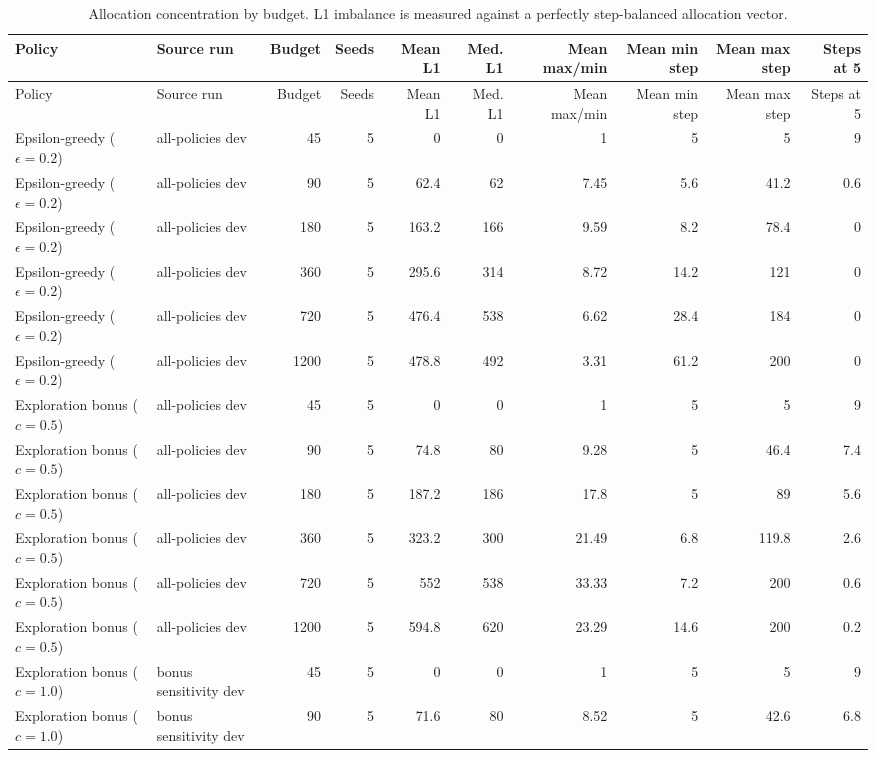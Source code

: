 \begin{landscape}
\begin{scriptsize}
\begin{longtable}{llrrrrrrrr}
\caption{Allocation concentration by budget. L1 imbalance is measured against a perfectly step-balanced allocation vector.}\label{tab:concentration-by-budget}\\
\toprule
Policy & Source run & Budget & Seeds & Mean L1 & Med. L1 & Mean max/min & Mean min step & Mean max step & Steps at 5 \\
\midrule
\endfirsthead
\toprule
Policy & Source run & Budget & Seeds & Mean L1 & Med. L1 & Mean max/min & Mean min step & Mean max step & Steps at 5 \\
\midrule
\endhead
Epsilon-greedy ($\epsilon=0.2$) & all-policies dev & 45 & 5 & 0 & 0 & 1 & 5 & 5 & 9 \\
Epsilon-greedy ($\epsilon=0.2$) & all-policies dev & 90 & 5 & 62.4 & 62 & 7.45 & 5.6 & 41.2 & 0.6 \\
Epsilon-greedy ($\epsilon=0.2$) & all-policies dev & 180 & 5 & 163.2 & 166 & 9.59 & 8.2 & 78.4 & 0 \\
Epsilon-greedy ($\epsilon=0.2$) & all-policies dev & 360 & 5 & 295.6 & 314 & 8.72 & 14.2 & 121 & 0 \\
Epsilon-greedy ($\epsilon=0.2$) & all-policies dev & 720 & 5 & 476.4 & 538 & 6.62 & 28.4 & 184 & 0 \\
Epsilon-greedy ($\epsilon=0.2$) & all-policies dev & 1200 & 5 & 478.8 & 492 & 3.31 & 61.2 & 200 & 0 \\
Exploration bonus ($c=0.5$) & all-policies dev & 45 & 5 & 0 & 0 & 1 & 5 & 5 & 9 \\
Exploration bonus ($c=0.5$) & all-policies dev & 90 & 5 & 74.8 & 80 & 9.28 & 5 & 46.4 & 7.4 \\
Exploration bonus ($c=0.5$) & all-policies dev & 180 & 5 & 187.2 & 186 & 17.8 & 5 & 89 & 5.6 \\
Exploration bonus ($c=0.5$) & all-policies dev & 360 & 5 & 323.2 & 300 & 21.49 & 6.8 & 119.8 & 2.6 \\
Exploration bonus ($c=0.5$) & all-policies dev & 720 & 5 & 552 & 538 & 33.33 & 7.2 & 200 & 0.6 \\
Exploration bonus ($c=0.5$) & all-policies dev & 1200 & 5 & 594.8 & 620 & 23.29 & 14.6 & 200 & 0.2 \\
Exploration bonus ($c=1.0$) & bonus sensitivity dev & 45 & 5 & 0 & 0 & 1 & 5 & 5 & 9 \\
Exploration bonus ($c=1.0$) & bonus sensitivity dev & 90 & 5 & 71.6 & 80 & 8.52 & 5 & 42.6 & 6.8 \\

\end{longtable}
\end{scriptsize}
\end{landscape}
